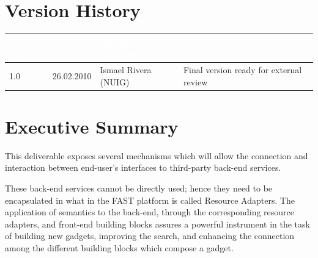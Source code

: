\documentclass{fast_latex}
\begin{document}


\section*{Version History}

\begin{small}
\begin{tabular}{|l|l|l|p{7.5cm}|}
\hline
\rowcolor{fast@lightgrey}\textcolor{white}{\textbf{Rev. No.}} &
                            \textcolor{white}{\textbf{Date}} &
                            \textcolor{white}{\textbf{Author (Partner)}} &
							\textcolor{white}{\textbf{Change description}}\\ \hline
1.0 & 26.02.2010 & Ismael Rivera (NUIG) & Final version ready for external review \\ \hline
\end{tabular}
\end{small}

\color{black}

\vfill

\newpage


\clearpage

\section*{Executive Summary}
\doublespacing

This deliverable exposes several mechanisms which will allow the connection and interaction between end-user's interfaces to third-party back-end services.

These back-end services cannot be directly used; hence they need to be encapsulated in what in the FAST platform is called Resource Adapters. The application of semantics to the back-end, through the corresponding resource adapters, and front-end building blocks assures a powerful instrument in the task of building new gadgets, improving the search, and enhancing the connection among the different building blocks which compose a gadget.
\end{document}

